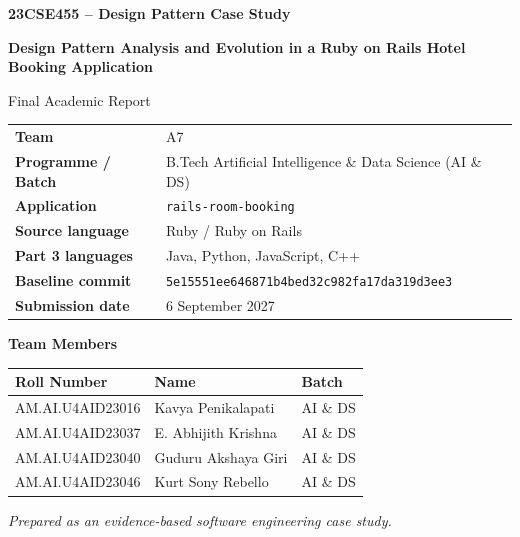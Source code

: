 \documentclass[10pt,a4paper]{article}
\newcommand{\code}[1]{\texttt{\small #1}}
\begin{document}
\hypersetup{pageanchor=false}
\begin{titlepage}
\centering
\vspace*{1.0cm}
{\Large\bfseries 23CSE455 -- Design Pattern Case Study\par}
\vspace{1.2cm}
{\LARGE\bfseries Design Pattern Analysis and Evolution in a Ruby on Rails Hotel Booking Application\par}
\vspace{1.4cm}
{\large Final Academic Report\par}
\vspace{1.2cm}

\begin{tabular}{ll}
\textbf{Team} & A7\\
\textbf{Programme / Batch} & B.Tech Artificial Intelligence \& Data Science (AI \& DS)\\
\textbf{Application} & \code{rails-room-booking}\\
\textbf{Source language} & Ruby / Ruby on Rails\\
\textbf{Part 3 languages} & Java, Python, JavaScript, C++\\
\textbf{Baseline commit} & \code{5e15551ee646871b4bed32c982fa17da319d3ee3}\\
\textbf{Submission date} & 6 September 2027
\end{tabular}

\vfill
{\large\bfseries Team Members\par}
\vspace{0.3cm}
\begin{tabular}{lll}
\toprule
Roll Number & Name & Batch\\
\midrule
AM.AI.U4AID23016 & Kavya Penikalapati & AI \& DS\\
AM.AI.U4AID23037 & E. Abhijith Krishna & AI \& DS\\
AM.AI.U4AID23040 & Guduru Akshaya Giri & AI \& DS\\
AM.AI.U4AID23046 & Kurt Sony Rebello & AI \& DS\\
\bottomrule
\end{tabular}

\vfill
\textit{Prepared as an evidence-based software engineering case study.}
\end{titlepage}

\hypersetup{pageanchor=true}
\cfoot{\thepage}
\tableofcontents
\clearpage
\listoffigures
\clearpage
\listoftables
\clearpage
{}
\end{document}
